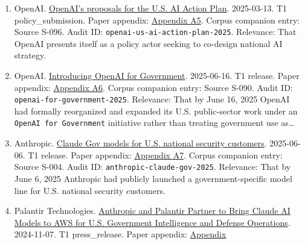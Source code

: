 \documentclass[
  american,
  11pt,
  letterpaper,
]{article}
\begin{document}
\begin{enumerate}
{  for Information on the Development of an Artificial Intelligence (AI)
  Action Plan}. 2025-02-06. T1 federal\_register\_notice. Paper
  appendix:
  \hyperref[appendix-a4-request-for-information-on-the-development-of-an-artificial-intelligence-ai-action-plan]{Appendix
  A4}. Corpus companion entry: Source S-054. Audit ID:
  \texttt{fr-ai-action-plan-rfi-2025}. Relevance: That the state created
  an official consultation pathway for shaping the 2025 AI doctrine.
\item
  OpenAI.
  \href{https://openai.com/global-affairs/openai-proposals-for-the-us-ai-action-plan/}{OpenAI's
  proposals for the U.S. AI Action Plan}. 2025-03-13. T1
  policy\_submission. Paper appendix:
  \hyperref[appendix-a5-openais-proposals-for-the-us-ai-action-plan]{Appendix
  A5}. Corpus companion entry: Source S-096. Audit ID:
  \texttt{openai-us-ai-action-plan-2025}. Relevance: That OpenAI
  presents itself as a policy actor seeking to co-design national AI
  strategy.
\item
  OpenAI.
  \href{https://openai.com/global-affairs/introducing-openai-for-government/}{Introducing
  OpenAI for Government}. 2025-06-16. T1 release. Paper appendix:
  \hyperref[appendix-a6-introducing-openai-for-government]{Appendix A6}.
  Corpus companion entry: Source S-090. Audit ID:
  \texttt{openai-for-government-2025}. Relevance: That by June 16, 2025
  OpenAI had formally reorganized and expanded its U.S. public-sector
  work under an \texttt{OpenAI\ for\ Government} initiative rather than
  treating government use as\ldots{}
\item
  Anthropic.
  \href{https://www.anthropic.com/news/claude-gov-models-for-u-s-national-security-customers}{Claude
  Gov models for U.S. national security customers}. 2025-06-06. T1
  release. Paper appendix:
  \hyperref[appendix-a7-claude-gov-models-for-u-s-national-security-customers]{Appendix
  A7}. Corpus companion entry: Source S-004. Audit ID:
  \texttt{anthropic-claude-gov-2025}. Relevance: That by June 6, 2025
  Anthropic had publicly launched a government-specific model line for
  U.S. national security customers.
\item
  Palantir Technologies.
  \href{https://investors.palantir.com/news-details/2024/Anthropic-and-Palantir-Partner-to-Bring-Claude-AI-Models-to-AWS-for-U.S.-Government-Intelligence-and-Defense-Operations/}{Anthropic
  and Palantir Partner to Bring Claude AI Models to AWS for U.S.
  Government Intelligence and Defense Operations}. 2024-11-07. T1
  press\_release. Paper appendix:
  \hyperref[appendix-a8-anthropic-and-palantir-partner-to-bring-claude-ai-models-to-aws-for-u-s-government-intelligence-and-defense-operations]{Appendix
}
\end{enumerate}
\end{document}
